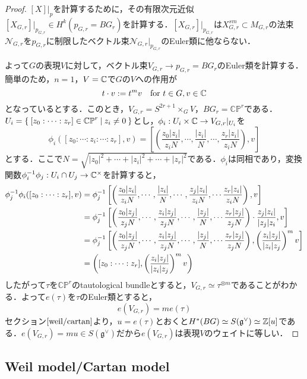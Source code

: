 \begin{proof}
  $[X]|_p$を計算するために，その有限次元近似$[X_{G,r}]|_{p_{G,r}}\in H^k(p_{G,r}=BG_r)$を計算する．$[X_{G,r}]|_{p_{G,r}}$は$X^{sm}_{G,r}\subset M_{G,r}$の法束$\mathcal{N}_{G,r}$を$p_{G,r}$に制限したベクトル束$\mathcal{N}_{G,r}|_{p_{G,r}}$のEuler類に他ならない．

  よって$G$の表現$V$に対して，ベクトル束$V_{G,r}\rightarrow p_{G,r}=BG_r$のEuler類を計算する．簡単のため，$n=1$，$V=\mathbb{C}$で$G$の$V$への作用が
  \[
  t\cdot v := t^mv \quad \text{for }t\in G,v\in\mathbb{C}
  \]
  となっているとする．このとき，$V_{G,r} = S^{2r+1}\times_G V$，$BG_r = \mathbb{CP}^r$である．$U_i = \left\{\:[z_0:\cdots:z_r]\in\mathbb{CP}^r\:\middle|\:z_i\neq 0\:\right\}$とし，$\phi_i:U_i\times \mathbb{C}\rightarrow V_{G,r}|_{U_i}$を
  \[
  \phi_i([z_0:\cdots:z_i:\cdots:z_r],v) = \left[\left(\frac{z_0|z_i|}{z_iN},\cdots,\frac{|z_i|}{N},\cdots,\frac{z_r|z_i|}{z_iN}\right), v \right]
  \]
  とする．ここで$N=\sqrt{|z_0|^2+\cdots+|z_i|^2+\cdots+|z_r|^2}$である．$\phi_i$は同相であり，変換関数$\phi_i^{-1}\phi_j:U_i\cap U_j\rightarrow \mathbb{C}^\times$を計算すると，
  \begin{align*}
    \phi_j^{-1}\phi_i([z_0:\cdots:z_r],v)
    &= \phi_j^{-1}\left[\left(\frac{z_0|z_i|}{z_iN},\cdots,\frac{|z_i|}{N},\cdots,\frac{z_j|z_i|}{z_iN},\cdots\frac{z_r|z_i|}{z_iN}\right), v \right]\\
    &=\phi_j^{-1}\left[\left(\frac{z_0|z_j|}{z_jN},\cdots,\frac{z_i|z_j|}{z_jN},\cdots,\frac{|z_j|}{N},\cdots\frac{z_r|z_j|}{z_jN}\right)\cdot \frac{z_j|z_i|}{|z_j|z_i},v\right]\\
    &=\phi_j^{-1}\left[\left(\frac{z_0|z_j|}{z_jN},\cdots,\frac{z_i|z_j|}{z_jN},\cdots,\frac{|z_j|}{N},\cdots\frac{z_r|z_j|}{z_jN}\right) , \left(\frac{z_i|z_j|}{|z_i|z_j}\right)^mv\right]\\
    &=\left([z_0:\cdots:z_r],\left(\frac{z_i|z_j|}{|z_i|z_j}\right)^mv\right)
  \end{align*}
  したがって$\tau$を$\mathbb{CP}^r$のtautological bundleとすると，$V_{G,r}\simeq \tau^{\otimes m}$であることがわかる．よって$e(\tau)$を$\tau$のEuler類とすると，
  \[
  e(V_{G,r}) = m e(\tau)
  \]
  セクション$\ref{weil/cartan}$より，$u=e(\tau)$とおくと$H^*(BG)\simeq S(\mathfrak{g}^\vee)\simeq \mathbb{Z}[u]$である．$e(V_{G,r})=mu\in S(\mathfrak{g}^\vee)$だから$e(V_{G,r})$は表現$V$のウェイトに等しい．
\end{proof}






\subsection{Weil model/Cartan model}\label{weil/cartan}

